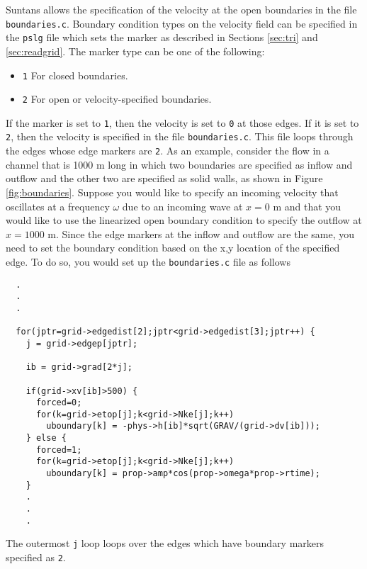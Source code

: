 \documentclass[12pt,oneside]{article}
\begin{document}
Suntans allows the specification of the velocity at the open boundaries in the file
\verb+boundaries.c+.  Boundary condition types on the velocity field can be specified in the \verb+pslg+ file
which sets the marker as described in Sections \ref{sec:tri} and \ref{sec:readgrid}.  The marker type
can be one of the following:
\begin{itemize}
\item \verb+1+ For closed boundaries.
\item \verb+2+ For open or velocity-specified boundaries.
\end{itemize}
If the marker is set to \verb+1+, then the velocity is set to \verb+0+ at those edges.  If it is set to \verb+2+,
then the velocity is specified in the file \verb+boundaries.c+.  This file loops through the edges whose edge
markers are \verb+2+.  As an example, consider the flow in a channel that is 1000 m long in which two boundaries
are specified as inflow and outflow and the other two are specified as solid walls, as shown in Figure 
\ref{fig:boundaries}.  
Suppose you would like to
specify an incoming velocity that oscillates at a frequency $\omega$ due to an incoming wave at $x=0$ m and that
you would like to use the linearized open boundary condition to specify the outflow at $x=1000$ m.  Since the
edge markers at the inflow and outflow are the same, you need to set the boundary condition based on the x,y
location of the specified edge.  To do so, you would set up the \verb+boundaries.c+ file as follows
\begin{verbatim}
  .
  .
  .

  for(jptr=grid->edgedist[2];jptr<grid->edgedist[3];jptr++) {
    j = grid->edgep[jptr];

    ib = grid->grad[2*j];

    if(grid->xv[ib]>500) {
      forced=0;
      for(k=grid->etop[j];k<grid->Nke[j];k++) 
        uboundary[k] = -phys->h[ib]*sqrt(GRAV/(grid->dv[ib]));
    } else {
      forced=1;
      for(k=grid->etop[j];k<grid->Nke[j];k++) 
        uboundary[k] = prop->amp*cos(prop->omega*prop->rtime);
    }
    .
    .
    .
\end{verbatim}
The outermost \verb+j+ loop loops over the edges which have boundary markers specified as \verb+2+.
\end{document}
